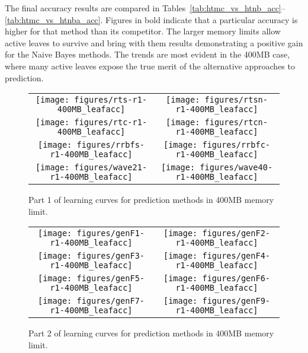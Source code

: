 The final accuracy results are compared in Tables~\ref{tab:htmc_vs_htnb_acc}--\ref{tab:htmc_vs_htnba_acc}. Figures in bold indicate that a particular accuracy is higher for that method than its competitor. The larger memory limits allow active leaves to survive and bring with them results demonstrating a positive gain for the Naive Bayes methods. The trends are most evident in the 400MB case, where many active leaves expose the true merit of the alternative approaches to prediction.


\begin{figure}
\centering
\begin{tabular}{c@{}c}
\texttt{[image: figures/rts-r1-400MB\_leafacc]} &
\texttt{[image: figures/rtsn-r1-400MB\_leafacc]} \\
\texttt{[image: figures/rtc-r1-400MB\_leafacc]} &
\texttt{[image: figures/rtcn-r1-400MB\_leafacc]} \\
\texttt{[image: figures/rrbfs-r1-400MB\_leafacc]} &
\texttt{[image: figures/rrbfc-r1-400MB\_leafacc]} \\
\texttt{[image: figures/wave21-r1-400MB\_leafacc]} &
\texttt{[image: figures/wave40-r1-400MB\_leafacc]} \\
\end{tabular}
\caption{Part 1 of learning curves for prediction methods in 400MB memory limit.}
\label{fig:400MB_pred1}
\end{figure}

\begin{figure}
\centering
\begin{tabular}{c@{}c}
\texttt{[image: figures/genF1-r1-400MB\_leafacc]} &
\texttt{[image: figures/genF2-r1-400MB\_leafacc]} \\
\texttt{[image: figures/genF3-r1-400MB\_leafacc]} &
\texttt{[image: figures/genF4-r1-400MB\_leafacc]} \\
\texttt{[image: figures/genF5-r1-400MB\_leafacc]} &
\texttt{[image: figures/genF6-r1-400MB\_leafacc]} \\
\texttt{[image: figures/genF7-r1-400MB\_leafacc]} &
\texttt{[image: figures/genF9-r1-400MB\_leafacc]} \\
\end{tabular}
\caption{Part 2 of learning curves for prediction methods in 400MB memory limit.}
\label{fig:400MB_pred2}
\end{figure}


